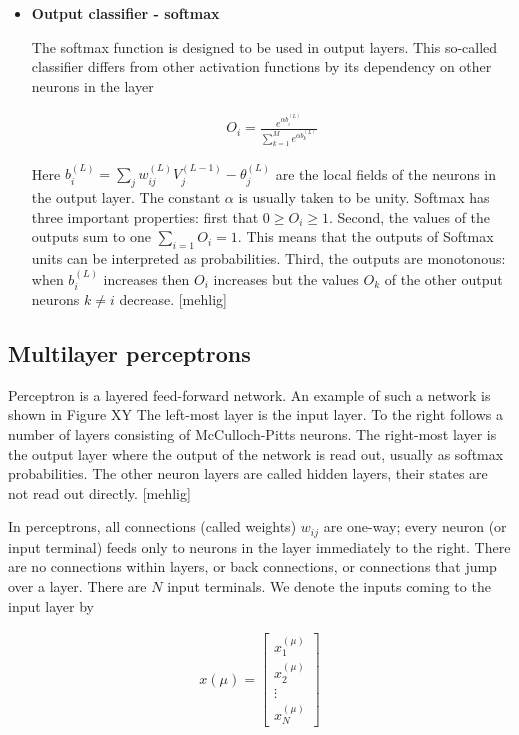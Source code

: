 \begin{itemize}
\item \textbf{Output classifier - softmax}

The softmax function is designed to be used in output layers. This so-called classifier differs from other activation functions by its dependency on other neurons in the layer

\begin{gather}
	O_{i} = \frac{e^{\alpha b_i^{(L)}}}{\sum_{k=1}^{M} e^{\alpha b_k^{(L)}}}
\end{gather}

Here $ b_{i}^{(L)} = \sum_{j}w_{ij}^{(L)} V_{j}^{(L-1)} - \theta _{j}^{(L)} $  are the local fields of the neurons in the output layer. The constant $\alpha$ is usually taken to be unity. Softmax has three important properties: first that 
$ 0 \geq O_i \geq 1 $. Second, the values of the outputs sum to one $ \sum_{i=1} O_i = 1 $. This means that the outputs of Softmax units can be interpreted as probabilities. Third, the outputs are monotonous: when $ b_i^{(L)} $ increases then $ O_i $ increases but the values $ O_k $ of the other output neurons $ k \neq i $ decrease. [mehlig]

\end{itemize}

\subsection{Multilayer perceptrons}

Perceptron is a layered feed-forward network. An example of such a network is shown in Figure XY The left-most layer is the input layer. To the right follows a number of layers consisting of McCulloch-Pitts neurons. The right-most layer is the output layer where the output of the network is read out, usually as softmax probabilities. The other neuron layers are called hidden layers, their states are not read out directly. [mehlig]

In perceptrons, all connections (called weights) $ w_{ij} $ are one-way; every neuron (or input terminal) feeds only to neurons in the layer immediately to the right. There are no connections within layers, or back connections, or connections that jump over a layer. There are $ N $ input terminals. We denote the inputs coming to the input layer by

\begin{gather}
	x(\mu)= 
	\begin{bmatrix}
	x_{1}^{(\mu)} \\
	x_{2}^{(\mu)} \\
	\vdots \\
	x_{N}^{(\mu)} 
	\end{bmatrix}
\end{gather}

